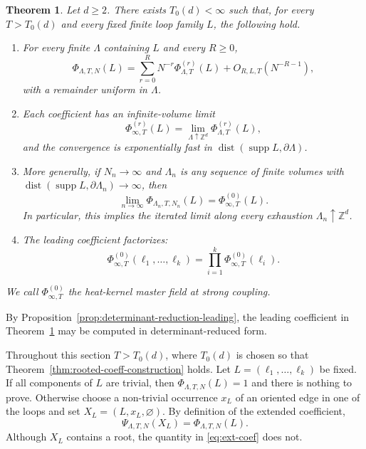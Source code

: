 \documentclass[11pt,a4paper,reqno]{amsart}
\newtheorem{theorem}{Theorem}[section]
\theoremstyle{definition}
\theoremstyle{remark}
\newcommand\Z{{\mathbb{Z}}}
\begin{document}
\begin{theorem}\label{thm:main-expanded}
Let $d\ge2$.  There exists $T_0(d)<\infty$ such that, for every $T>T_0(d)$ and every fixed finite loop family $L$, the following hold.
\begin{enumerate}
\item For every finite $\Lambda$ containing $L$ and every $R\ge0$,
\begin{equation}\label{eq:finite-volume-expansion}
\Phi_{\Lambda,T,N}(L)
=
\sum_{r=0}^R N^{-r}\Phi^{(r)}_{\Lambda,T}(L)
+
O_{R,L,T}(N^{-R-1}),
\end{equation}
with a remainder uniform in $\Lambda$.
\item Each coefficient has an infinite-volume limit
\begin{equation}\label{eq:coefficient-limit}
\Phi^{(r)}_{\infty,T}(L)=\lim_{\Lambda\uparrow\Z^d}\Phi^{(r)}_{\Lambda,T}(L),
\end{equation}
and the convergence is exponentially fast in $\operatorname{dist}(\operatorname{supp}L,\partial\Lambda)$.
\item More generally, if $N_n\to\infty$ and $\Lambda_n$ is any sequence of finite volumes with $\operatorname{dist}(\operatorname{supp}L,\partial\Lambda_n)\to\infty$, then
\begin{equation}\label{eq:largeN-limit}
\lim_{n\to\infty}\Phi_{\Lambda_n,T,N_n}(L)=\Phi^{(0)}_{\infty,T}(L).
\end{equation}
In particular, this implies the iterated limit along every exhaustion $\Lambda_n\uparrow\Z^d$.
\item The leading coefficient factorizes:
\begin{equation}\label{eq:factorization}
\Phi^{(0)}_{\infty,T}(\ell_1,\ldots,\ell_k)
=
\prod_{i=1}^k\Phi^{(0)}_{\infty,T}(\ell_i).
\end{equation}
\end{enumerate}
We call $\Phi^{(0)}_{\infty,T}$ the heat-kernel master field at strong coupling.
\end{theorem}

By Proposition~\ref{prop:determinant-reduction-leading}, the leading coefficient in Theorem~\ref{thm:main-expanded} may be computed in determinant-reduced form.

Throughout this section $T>T_0(d)$, where $T_0(d)$ is chosen so that Theorem~\ref{thm:rooted-coeff-construction} holds.  Let $L=(\ell_1,\ldots,\ell_k)$ be fixed.  If all components of $L$ are trivial, then $\Phi_{\Lambda,T,N}(L)=1$ and there is nothing to prove.  Otherwise choose a non-trivial occurrence $x_L$ of an oriented edge in one of the loops and set $X_L=(L,x_L,\varnothing)$.  By definition of the extended coefficient,
\begin{equation}\label{eq:ext-coef}
\Psi_{\Lambda,T,N}(X_L)=\Phi_{\Lambda,T,N}(L).
\end{equation}
Although $X_L$ contains a root, the quantity in \eqref{eq:ext-coef} does not.
\end{document}
